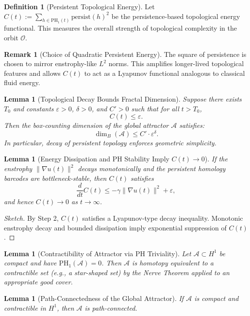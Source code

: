 \documentclass[11pt]{article}
\newtheorem{lemma}[theorem]{Lemma}
\theoremstyle{definition}
\newtheorem{definition}[theorem]{Definition}
\newtheorem{remark}[theorem]{Remark}
\begin{document}
\begin{definition}[Persistent Topological Energy]
Let $C(t) := \sum_{h \in \mathrm{PH}_1(t)} \mathrm{persist}(h)^2$ be the persistence-based topological energy functional. This measures the overall strength of topological complexity in the orbit $\mathcal{O}$.
\end{definition}

\begin{remark}[Choice of Quadratic Persistent Energy]
The square of persistence is chosen to mirror enstrophy-like $L^2$ norms. This amplifies longer-lived topological features and allows $C(t)$ to act as a Lyapunov functional analogous to classical fluid energy.
\end{remark}

\begin{lemma}[Topological Decay Bounds Fractal Dimension]
\label{lem:fractal-dim-bound}
Suppose there exists $T_0$ and constants $\varepsilon > 0$, $\delta > 0$, and $C' > 0$ such that for all $t > T_0$,
\[
C(t) \le \varepsilon.
\]
Then the box-counting dimension of the global attractor $\mathcal{A}$ satisfies:
\[
\dim_B(\mathcal{A}) \le C' \cdot \varepsilon^{\delta}.
\]
In particular, decay of persistent topology enforces geometric simplicity.
\end{lemma}

\begin{lemma}[Energy Dissipation and PH Stability Imply $C(t) \to 0$]
If the enstrophy $\|\nabla u(t)\|^2$ decays monotonically and the persistent homology barcodes are bottleneck-stable, then $C(t)$ satisfies
\[
\frac{d}{dt} C(t) \le -\gamma \|\nabla u(t)\|^2 + \varepsilon,
\]
and hence $C(t) \to 0$ as $t \to \infty$.
\end{lemma}

\begin{proof}[Sketch]
By Step 2, $C(t)$ satisfies a Lyapunov-type decay inequality. Monotonic enstrophy decay and bounded dissipation imply exponential suppression of $C(t)$.
\end{proof}

\begin{lemma}[Contractibility of Attractor via PH Triviality]
Let $\mathcal{A} \subset H^1$ be compact and have $\mathrm{PH}_1(\mathcal{A}) = 0$. Then $\mathcal{A}$ is homotopy equivalent to a contractible set (e.g., a star-shaped set) by the Nerve Theorem applied to an appropriate good cover.
\end{lemma}

\begin{lemma}[Path-Connectedness of the Global Attractor]
If $\mathcal{A}$ is compact and contractible in $H^1$, then $\mathcal{A}$ is path-connected.
\end{lemma}
\end{document}
